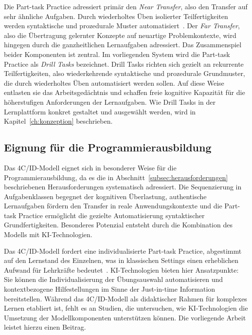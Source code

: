 Die Part-task Practice adressiert primär den \textit{Near Transfer}, also den Transfer auf sehr ähnliche Aufgaben. Durch wiederholtes Üben isolierter Teilfertigkeiten werden syntaktische und prozedurale Muster automatisiert~\cite{vanmerrienboer2018}. Der \textit{Far Transfer}, also die Übertragung gelernter Konzepte auf neuartige Problemkontexte, wird hingegen durch die ganzheitlichen Lernaufgaben adressiert. Das Zusammenspiel beider Komponenten ist zentral. Im vorliegenden System wird die Part-task Practice als \textit{Drill Tasks} bezeichnet. Drill Tasks richten sich gezielt an rekurrente Teilfertigkeiten, also wiederkehrende syntaktische und prozedurale Grundmuster, die durch wiederholtes Üben automatisiert werden sollen. Auf diese Weise entlasten sie das Arbeitsgedächtnis und schaffen freie kognitive Kapazität für die höherstufigen Anforderungen der Lernaufgaben. Wie Drill Tasks in der Lernplattform konkret gestaltet und ausgewählt werden, wird in Kapitel~\ref{ch:konzeption} beschrieben.

\clearpage
\subsection{Eignung für die Programmierausbildung}\label{subsec:4cid-eignung}

Das 4C/ID-Modell eignet sich in besonderer Weise für die Programmierausbildung, da es die in Abschnitt~\ref{subsec:herausforderungen} beschriebenen Herausforderungen systematisch adressiert. Die Sequenzierung in Aufgabenklassen begegnet der kognitiven Überlastung, authentische Lernaufgaben fördern den Transfer in reale Anwendungskontexte und die Part-task Practice ermöglicht die gezielte Automatisierung syntaktischer Grundfertigkeiten.
Besonderes Potenzial entsteht durch die Kombination des Modells mit KI-Technologien. 

Das 4C/ID-Modell fordert eine individualisierte Part-task Practice, abgestimmt auf den Lernstand des Einzelnen, was in klassischen Settings einen erheblichen Aufwand für Lehrkräfte bedeutet~\cite{vanmerrienboer2018}. KI-Technologien bieten hier Ansatzpunkte: Sie können die Individualisierung der Übungsauswahl automatisieren und kontextbezogene Hilfestellungen im Sinne der Just-in-time Information bereitstellen. Während das 4C/ID-Modell als didaktischer Rahmen für komplexes Lernen etabliert ist, fehlt es an Studien, die untersuchen, wie KI-Technologien die Umsetzung der Modellkomponenten unterstützen können. Die vorliegende Arbeit leistet hierzu einen Beitrag.


